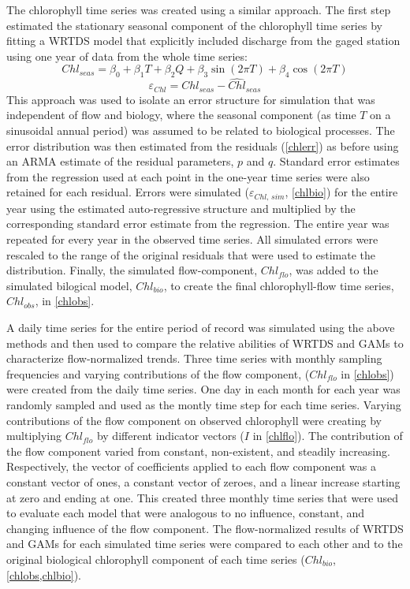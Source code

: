 \documentclass[letterpaper,12pt,oneside]{article}\usepackage[]{graphicx}\usepackage[]{color}
\begin{document}
The chlorophyll time series was created using a similar approach.  The first step estimated the stationary seasonal component of the chlorophyll time series by fitting a \ac{WRTDS} model \citep{Hirsch10} that explicitly included discharge from the gaged station using one year of data from the whole time series:
\begin{equation}\label{chlseas}
Chl_{seas} = \beta_0 + \beta_1 T + \beta_2 Q + \beta_3 \sin\left(2\pi T\right) + \beta_4 \cos\left(2\pi T\right)
\end{equation}
\begin{equation} \label{chlerr}
\varepsilon_{Chl} = Chl_{seas} - \hat{Chl}_{seas}
\end{equation}
This approach was used to isolate an error structure for simulation that was independent of flow and biology, where the seasonal component (as time $T$ on a sinusoidal annual period) was assumed to be related to biological processes.  The error distribution was then estimated from the residuals (\cref{chlerr}) as before using an \ac{ARMA} estimate of the residual parameters, $p$ and $q$.  Standard error estimates from the regression used at each point in the one-year time series were also retained for each residual.  Errors were simulated ($\varepsilon_{Chl,\,sim}$, \cref{chlbio}) for the entire year using the estimated auto-regressive structure and multiplied by the corresponding standard error estimate from the regression.  The entire year was repeated for every year in the observed time series.  All simulated errors were rescaled to the range of the original residuals that were used to estimate the distribution.  Finally, the simulated flow-component, $Chl_{flo}$, was added to the simulated bilogical model, $Chl_{bio}$, to create the final chlorophyll-flow time series, $Chl_{obs}$, in \cref{chlobs}.  

A daily time series for the entire period of record was simulated using the above methods and then used to compare the relative abilities of \ac{WRTDS} and \acp{GAM} to characterize flow-normalized trends.  Three time series with monthly sampling frequencies and varying contributions of the flow component, ($Chl_{flo}$ in \cref{chlobs}) were created from the daily time series. One day in each month for each year was randomly sampled and used as the montly time step for each time series.  Varying contributions of the flow component on observed chlorophyll were creating by multiplying $Chl_{flo}$ by different indicator vectors ($I$ in \cref{chlflo}).  The contribution of the flow component varied from constant, non-existent, and steadily increasing.  Respectively, the vector of coefficients applied to each flow component was a constant vector of ones, a constant vector of zeroes, and a linear increase starting at zero and ending at one.  This created three monthly time series that were used to evaluate each model that were analogous to no influence, constant, and changing influence of the flow component.  The flow-normalized results of \ac{WRTDS} and \acp{GAM} for each simulated time series were compared to each other and to the original biological chlorophyll component of each time series ($Chl_{bio}$, \cref{chlobs,chlbio}).
\end{document}
